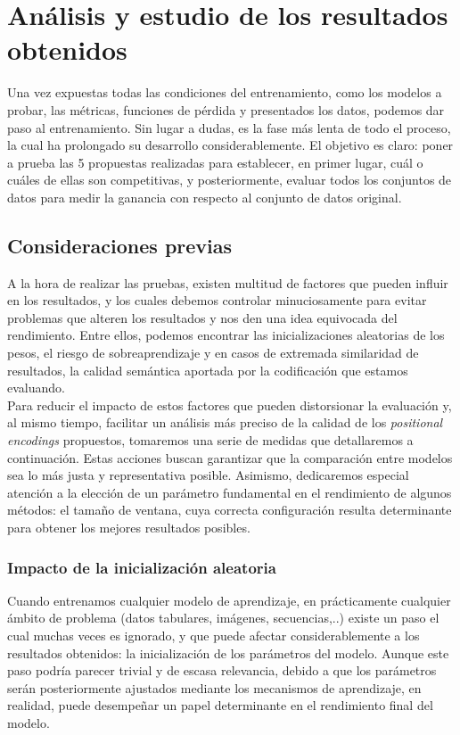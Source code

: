 \chapter{Análisis y estudio de los resultados obtenidos}

Una vez expuestas todas las condiciones del entrenamiento, como los modelos a probar, las métricas, funciones de pérdida y presentados los datos, podemos dar paso al entrenamiento. Sin lugar a dudas, es la fase más lenta de todo el proceso, la cual ha prolongado su desarrollo considerablemente. El objetivo es claro: poner a prueba las 5 propuestas realizadas para establecer, en primer lugar, cuál o cuáles de ellas son competitivas, y posteriormente, evaluar todos los conjuntos de datos para medir la ganancia con respecto al conjunto de datos original.

\section{Consideraciones previas}

A la hora de realizar las pruebas, existen multitud de factores que pueden influir en los resultados, y los cuales debemos controlar minuciosamente para evitar problemas que alteren los resultados y nos den una idea equivocada del rendimiento. Entre ellos, podemos encontrar las inicializaciones aleatorias de los pesos, el riesgo de sobreaprendizaje y en casos de extremada similaridad de resultados, la calidad semántica aportada por la codificación que estamos evaluando.\\

Para reducir el impacto de estos factores que pueden distorsionar la evaluación y, al mismo tiempo, facilitar un análisis más preciso de la calidad de los \textit{positional encodings} propuestos, tomaremos una serie de medidas que detallaremos a continuación. Estas acciones buscan garantizar que la comparación entre modelos sea lo más justa y representativa posible. Asimismo, dedicaremos especial atención a la elección de un parámetro fundamental en el rendimiento de algunos métodos: el tamaño de ventana, cuya correcta configuración resulta determinante para obtener los mejores resultados posibles.


\subsection{Impacto de la inicialización aleatoria}

Cuando entrenamos cualquier modelo de aprendizaje, en prácticamente cualquier ámbito de problema (datos tabulares, imágenes, secuencias,..) existe un paso el cual muchas veces es ignorado, y que puede afectar considerablemente a los resultados obtenidos: la inicialización de los parámetros del modelo. Aunque este paso podría parecer trivial y de escasa relevancia, debido a que los parámetros serán posteriormente ajustados mediante los mecanismos de aprendizaje, en realidad, puede desempeñar un papel determinante en el rendimiento final del modelo.\\

